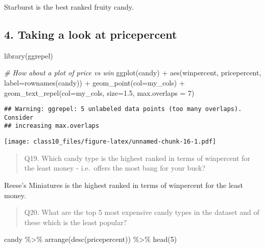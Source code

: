 \documentclass[
]{article}
\newenvironment{Shaded}{\begin{snugshade}}{\end{snugshade}}
\newcommand{\AttributeTok}[1]{\textcolor[rgb]{0.77,0.63,0.00}{#1}}
\newcommand{\CommentTok}[1]{\textcolor[rgb]{0.56,0.35,0.01}{\textit{#1}}}
\newcommand{\DecValTok}[1]{\textcolor[rgb]{0.00,0.00,0.81}{#1}}
\newcommand{\FloatTok}[1]{\textcolor[rgb]{0.00,0.00,0.81}{#1}}
\newcommand{\FunctionTok}[1]{\textcolor[rgb]{0.00,0.00,0.00}{#1}}
\newcommand{\NormalTok}[1]{#1}
\newcommand{\SpecialCharTok}[1]{\textcolor[rgb]{0.00,0.00,0.00}{#1}}
\begin{document}
Starburst is the best ranked fruity candy.

\hypertarget{taking-a-look-at-pricepercent}{%
\subsection{4. Taking a look at
pricepercent}\label{taking-a-look-at-pricepercent}}

\begin{Shaded}
\begin{Highlighting}[]
\FunctionTok{library}\NormalTok{(ggrepel)}

\CommentTok{\# How about a plot of price vs win}
\FunctionTok{ggplot}\NormalTok{(candy) }\SpecialCharTok{+}
  \FunctionTok{aes}\NormalTok{(winpercent, pricepercent, }\AttributeTok{label=}\FunctionTok{rownames}\NormalTok{(candy)) }\SpecialCharTok{+}
  \FunctionTok{geom\_point}\NormalTok{(}\AttributeTok{col=}\NormalTok{my\_cols) }\SpecialCharTok{+} 
  \FunctionTok{geom\_text\_repel}\NormalTok{(}\AttributeTok{col=}\NormalTok{my\_cols, }\AttributeTok{size=}\FloatTok{1.5}\NormalTok{, }\AttributeTok{max.overlaps =} \DecValTok{7}\NormalTok{)}
\end{Highlighting}
\end{Shaded}

\begin{verbatim}
## Warning: ggrepel: 5 unlabeled data points (too many overlaps). Consider
## increasing max.overlaps
\end{verbatim}

\texttt{[image: class10\_files/figure-latex/unnamed-chunk-16-1.pdf]}

\begin{quote}
Q19. Which candy type is the highest ranked in terms of winpercent for
the least money - i.e.~offers the most bang for your buck?
\end{quote}

Reese's Miniatures is the highest ranked in terms of winpercent for the
least money.

\begin{quote}
Q20. What are the top 5 most expensive candy types in the dataset and of
these which is the least popular?
\end{quote}

\begin{Shaded}
\begin{Highlighting}[]
\NormalTok{candy }\SpecialCharTok{\%\textgreater{}\%} \FunctionTok{arrange}\NormalTok{(}\FunctionTok{desc}\NormalTok{(pricepercent)) }\SpecialCharTok{\%\textgreater{}\%} \FunctionTok{head}\NormalTok{(}\DecValTok{5}\NormalTok{)}
\end{Highlighting}
\end{Shaded}
\end{document}
